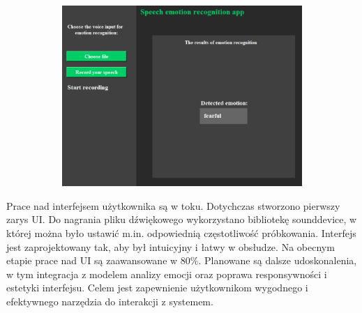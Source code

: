 \documentclass[12pt,titlepage]{article}
\begin{document}
\begin{figure}[ht]
\begin{subfigure}[b]{0.3\textwidth}
        \label{fig:sub2}
    \end{subfigure}
    \hfill
    \begin{subfigure}[b]{0.3\textwidth}
        \centering
        \includegraphics[width=\textwidth]{img/3.png}
        \label{fig:sub3}
    \end{subfigure}
    \label{fig:main}
\end{figure}
Prace nad interfejsem użytkownika są w toku. Dotychczas stworzono pierwszy zarys UI. Do nagrania pliku dźwiękowego wykorzystano bibliotekę sounddevice, w której można było ustawić m.in. odpowiednią częstotliwość próbkowania. Interfejs jest zaprojektowany tak, aby był intuicyjny i łatwy w obsłudze. Na obecnym etapie prace nad UI są zaawansowane w 80\%. Planowane są dalsze udoskonalenia, w tym integracja z modelem analizy emocji oraz poprawa responsywności i estetyki interfejsu. Celem jest zapewnienie użytkownikom wygodnego i efektywnego narzędzia do interakcji z systemem.
\end{document}
